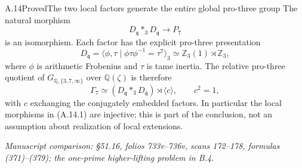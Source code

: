 \begin{statement}{A.14}{Proved}{The two local factors generate the entire global pro-three group}
The natural morphism
\[
 D_{\mathfrak q}*_{3}D_{\overline{\mathfrak q}}
       \longrightarrow P_7
 \tag{A.14.1}
\]
is an isomorphism. Each factor has the explicit pro-three
presentation
\[
 D_{\mathfrak q}=
 \langle\phi,\tau\mid\phi\tau\phi^{-1}=\tau^7\rangle_{3}
       \simeq\mathbb Z_3(1)\rtimes\mathbb Z_3,
 \tag{A.14.2}
\]
where $\phi$ is arithmetic Frobenius and $\tau$ is tame inertia.
The relative pro-three quotient of
$G_{\mathbb Q,\{3,7,\infty\}}$ over $\mathbb Q(\zeta)$ is
therefore
\[
 \Gamma_7\simeq
 (D_{\mathfrak q}*_{3}D_{\overline{\mathfrak q}})
           \rtimes\langle c\rangle,\qquad c^2=1,
 \tag{A.14.3}
\]
with $c$ exchanging the conjugately embedded factors. In particular
the local morphisms in (A.14.1) are injective; this is part of the
conclusion, not an assumption about realization of local extensions.
\par\smallskip\noindent\emph{Manuscript comparison: \S51.16,
folios 733v--736v, scans 172--178, formulas (371)--(379); the
one-prime higher-lifting problem in B.4.}
\end{statement}
